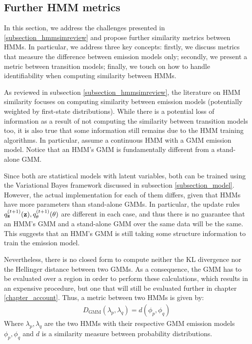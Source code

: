 \documentclass[../main.tex]{subfiles}
\begin{document}
\subsection{Further HMM metrics} \label{subsection_hmmsim}
In this section, we address the challenges presented in \ref{subsection_hmmsimreview} and propose further similarity metrics between HMMs. In particular, we address three key concepts: firstly, we discuss metrics that measure the difference between emission models only; secondly, we present a metric between transition models; finally, we touch on how to handle identifiability when computing similarity between HMMs.
\par As reviewed in subsection \ref{subsection_hmmsimreview}, the literature on HMM similarity focuses on computing similarity between emission models (potentially weighted by first-state distributions). While there is a potential loss of information as a result of not computing the similarity between transition models too, it is also true that some information still remains due to the HMM training algorithms. In particular, assume a continuous HMM with a GMM emission model. Notice that an HMM's GMM is fundamentally different from a stand-alone GMM.
\par Since both are statistical models with latent variables, both can be trained using the Variational Bayes framework discussed in subsection \ref{subsection_model}. However, the actual implementation for each of them differs, given that HMMs have more parameters than stand-alone GMMs. In particular, the update rules $q_{\mathbf{z}}^{(t+1)}(\mathbf{z}), q_{\theta}^{(t+1)}(\theta)$ are different in each case, and thus there is no guarantee that an HMM's GMM and a stand-alone GMM over the same data will be the same. This suggests that an HMM's GMM is still taking some structure information to train the emission model.
\par Nevertheless, there is no closed form to compute neither the KL divergence nor the Hellinger distance between two GMMs. As a consequence, the GMM has to be evaluated over a region in order to perform these calculations, which results in an expensive procedure, but one that will still be evaluated further in chapter \ref{chapter_account}. Thus, a metric between two HMMs is given by:
\begin{align*}
D_{\text{GMM}}(\lambda_p, \lambda_q) = d( \phi_p, \phi_q )
\end{align*}
Where $\lambda_p, \lambda_q$ are the two HMMs with their respective GMM emission models $\phi_p, \phi_q$ and $d$ is a similarity measure between probability distributions.
\end{document}
